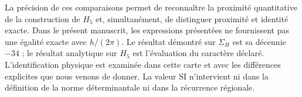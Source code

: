 La précision de ces comparaisons permet de reconnaître la proximité
quantitative de la construction de \(H_5\) et, simultanément, de distinguer
proximité et identité exacte. Dans le présent manuscrit, les expressions
présentées ne fournissent pas une égalité exacte avec \(h/(2\pi)\).
Le résultat démontré sur \(\Sigma_H\) est sa décennie \(-34\) ;
le résultat analytique sur \(H_5\) est l'évaluation du caractère
déclaré. L'identification physique est examinée dans cette carte et avec les
différences explicites que nous venons de donner. La valeur SI n'intervient
ni dans la définition de la norme déterminantale ni dans la récurrence régionale.


